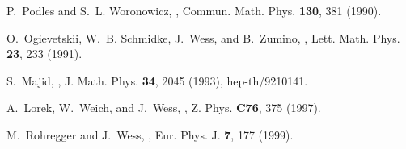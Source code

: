 \documentclass[12pt,a4paper]{article}
\begin{document}
\begin{thebibliography}{10}
P.~Podles and S.~L. Woronowicz,
,
\newblock Commun. Math. Phys. {\bf 130}, 381 (1990).

O.~Ogievetskii, W.~B. Schmidke, J.~Wess, and B.~Zumino,
,
\newblock Lett. Math. Phys. {\bf 23}, 233 (1991).

S.~Majid,
,
\newblock J. Math. Phys. {\bf 34}, 2045 (1993), hep-th/9210141.

A.~Lorek, W.~Weich, and J.~Wess,
,
\newblock Z. Phys. {\bf C76}, 375 (1997).

M.~Rohregger and J.~Wess,
,
\newblock Eur. Phys. J. {\bf 7}, 177 (1999).

\end{thebibliography}
\end{document}
